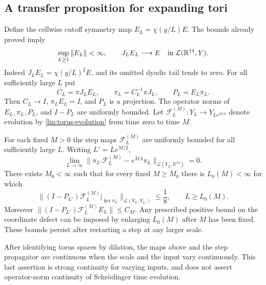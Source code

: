 \subsection{A transfer proposition for expanding tori}

Define the cellwise cutoff symmetry map $E_L=\chi(y/L)E$.
The bounds already proved imply
\begin{equation}\label{lin:EL-convergence}
 \sup_{L\ge1}\|E_L\|<\infty,\qquad J_LE_L\longrightarrow E
       \quad\hbox{in }\mathcal L(\mathbb R^{14},Y).
\end{equation}
Indeed $J_LE_L=\chi(y/L)^2E$, and its omitted dyadic tail tends to
zero.  For all sufficiently large $L$ put
\begin{equation}\label{lin:piL}
 C_L=\pi J_LE_L,\qquad
 \pi_L=C_L^{-1}\pi J_L,\qquad P_L=E_L\pi_L.
\end{equation}
Then $C_L\to I$, $\pi_LE_L=I$, and $P_L$ is a projection.  The
operator norms of $E_L,\pi_L,P_L$, and $I-P_L$ are uniformly bounded.
Let $\mathcal F_L^{(M)}:Y_L\to Y_{Le^{M/2}}$ denote evolution by
\eqref{lin:torus-evolution} from time zero to time $M$.

\begin{proposition}\label{linear:torus}
For each fixed $M>0$ the step maps $\mathcal F_L^{(M)}$ are uniformly
bounded for all sufficiently large $L$.  Writing $L'=Le^{M/2}$,
\begin{equation}\label{lin:coordinate-defect}
 \lim_{L\to\infty}
 \|\pi_{L'}\mathcal F_L^{(M)}-e^{M\Lambda}\pi_L\|
 _{\mathcal L(Y_L,\mathbb R^{14})}=0.
\end{equation}
There exists $M_0<\infty$ such that for every fixed $M\ge M_0$
there is $L_0(M)<\infty$ for which
\begin{equation}\label{lin:torus-stable-contraction}
 \|(I-P_{L'})\mathcal F_L^{(M)}|_{\ker\pi_L}\|
       _{\mathcal L(Y_L,Y_{L'})}\le\frac18,
 \qquad L\ge L_0(M).
\end{equation}
Moreover $\|(I-P_{L'})\mathcal F_L^{(M)}E_L\|\le C_M$.
Any prescribed positive bound on the coordinate defect can be imposed
by enlarging $L_0(M)$ after $M$ has been fixed.  These bounds persist
after restarting a step at any larger scale.

After identifying torus spaces by dilation, the maps above and the
step propagator are continuous when the scale and the input vary
continuously.  This last assertion is strong continuity for varying
inputs, and does not assert operator-norm continuity of Schr\"odinger
time evolution.
\end{proposition}

